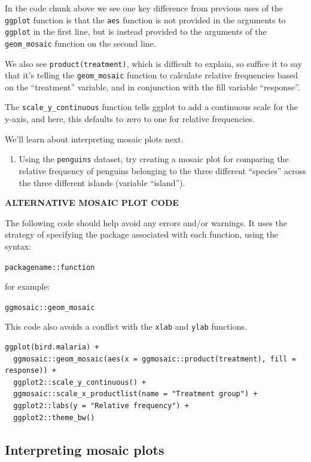 \documentclass[
]{book}
\providecommand{\tightlist}{%
  \setlength{\itemsep}{0pt}\setlength{\parskip}{0pt}}
\begin{document}
In the code chunk above we see one key difference from previous uses of the \texttt{ggplot} function is that the \texttt{aes} function is not provided in the arguments to \texttt{ggplot} in the first line, but is instead provided to the arguments of the \texttt{geom\_mosaic} function on the second line.

We also see \texttt{product(treatment)}, which is difficult to explain, so suffice it to say that it's telling the \texttt{geom\_mosaic} function to calculate relative frequencies based on the ``treatment'' variable, and in conjunction with the fill variable ``response''.

The \texttt{scale\_y\_continuous} function tells ggplot to add a continuous scale for the y-axis, and here, this defaults to zero to one for relative frequencies.

We'll learn about interpreting mosaic plots next.

\begin{enumerate}
\def\labelenumi{\arabic{enumi}.}
\tightlist
\item
  Using the \texttt{penguins} dataset, try creating a mosaic plot for comparing the relative frequency of penguins belonging to the three different ``species'' across the three different islands (variable ``island'').
\end{enumerate}

\textbf{ALTERNATIVE MOSAIC PLOT CODE}

The following code should help avoid any errors and/or warnings. It uses the strategy of specifying the package associated with each function, using the syntax:

\texttt{packagename::function}

for example:

\texttt{ggmosaic::geom\_mosaic}

This code also avoids a conflict with the \texttt{xlab} and \texttt{ylab} functions.

\begin{verbatim}
ggplot(bird.malaria) +
  ggmosaic::geom_mosaic(aes(x = ggmosaic::product(treatment), fill = response)) +
  ggplot2::scale_y_continuous() +
  ggmosaic::scale_x_productlist(name = "Treatment group") +  
  ggplot2::labs(y = "Relative frequency") +
  ggplot2::theme_bw()
\end{verbatim}

\subsection{Interpreting mosaic plots}\label{interpret_mosaic}
\end{document}
